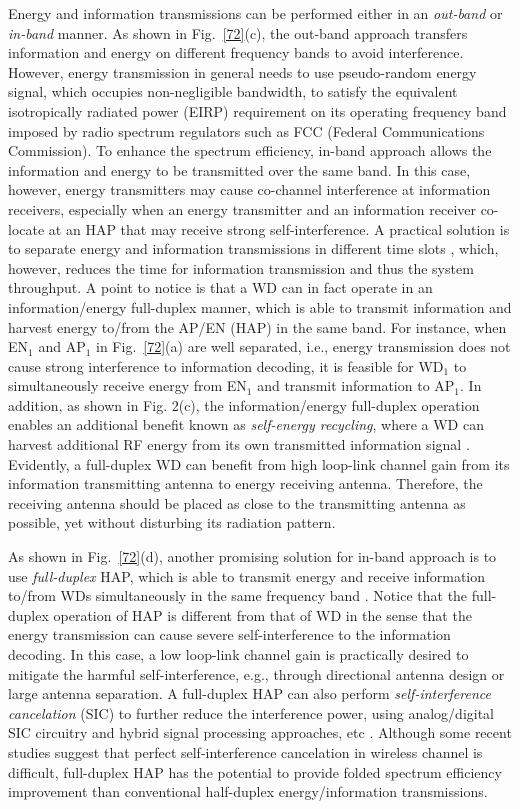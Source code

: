 \documentclass[journal, draftcls, one column, 12pt]{IEEEtran}
\begin{document}
Energy and information transmissions can be performed either in an \emph{out-band} or \emph{in-band} manner. As shown in Fig.~\ref{72}(c), the out-band approach transfers information and energy on different frequency bands to avoid interference. However, energy transmission in general needs to use pseudo-random energy signal, which occupies non-negligible bandwidth, to satisfy the equivalent isotropically radiated power (EIRP) requirement on its operating frequency band imposed by radio spectrum regulators such as FCC (Federal Communications Commission). To enhance the spectrum efficiency, in-band approach allows the information and energy to be transmitted over the same band. In this case, however, energy transmitters may cause co-channel interference at information receivers, especially when an energy transmitter and an information receiver co-locate at an HAP that may receive strong self-interference. A practical  solution is to separate energy and information transmissions in different time slots \cite{2014:Ju}, which, however, reduces the time for information transmission and thus the system throughput. A point to notice is that a WD can in fact operate in an information/energy full-duplex manner, which is able to transmit information and harvest energy to/from the AP/EN (HAP) in the same band. For instance, when EN$_1$ and AP$_1$ in Fig.~\ref{72}(a) are well separated, i.e., energy transmission does not cause strong interference to information decoding, it is feasible for WD$_1$ to simultaneously receive energy from EN$_1$ and transmit information to AP$_1$. In addition, as shown in Fig. 2(c), the information/energy full-duplex operation enables an additional benefit known as \emph{self-energy recycling}, where a WD can harvest additional RF energy from its own transmitted information signal \cite{2015:Zeng1}. Evidently, a full-duplex WD can benefit from high loop-link channel gain from its information transmitting antenna to energy receiving antenna. Therefore, the receiving antenna should be placed as close to the transmitting antenna as possible, yet without disturbing its radiation pattern.

As shown in Fig.~\ref{72}(d), another promising solution for in-band approach is to use \emph{full-duplex} HAP, which is able to transmit energy and receive information to/from WDs simultaneously in the same frequency band \cite{2014:Ju1}. Notice that the full-duplex operation of HAP is different from that of WD in the sense that the energy transmission can cause severe self-interference to the information decoding. In this case, a low loop-link channel gain is practically desired to mitigate the harmful self-interference, e.g., through directional antenna design or large antenna separation. A full-duplex HAP can also perform \emph{self-interference cancelation} (SIC) to further reduce the interference power, using analog/digital SIC circuitry and hybrid signal processing approaches, etc \cite{2014:Sabharwal}. Although some recent studies suggest that perfect self-interference cancelation in wireless channel is difficult, full-duplex HAP has the potential to provide folded spectrum efficiency improvement than conventional half-duplex energy/information transmissions.
\end{document}

